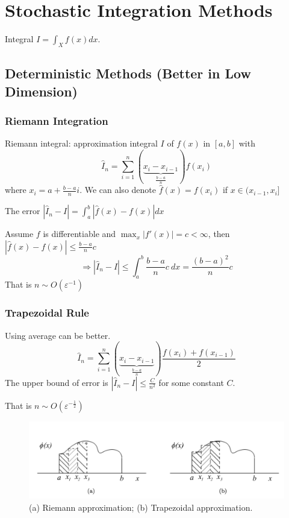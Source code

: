 \documentclass[11pt]{elegantbook}
\begin{document}
\chapter{Stochastic Integration Methods}
Integral $I=\int_Xf(x)dx$.

\section{Deterministic Methods (Better in Low Dimension)}
\subsection{Riemann Integration}
Riemann integral: approximation integral $I$ of $f(x)$ in $[a,b]$ with $$\hat{I}_n=\sum_{i=1}^n(\underbrace{x_i-x_{i-1}}_{\frac{b-a}{n}})f(x_i)$$
where $x_i=a+\frac{b-a}{n}i$. We can also denote $\hat{f}(x)=f(x_i)$ if $x\in (x_{i-1},x_i]$

The error $|\hat{I}_n-I|=\int_a^b|\hat{f}(x)-f(x)|dx$

Assume $f$ is differentiable and $\max_x|f'(x)|=c<\infty$, then $|\hat{f}(x)-f(x)|\leq \frac{b-a}{n}c$
$$\Rightarrow |\hat{I}_n-I|\leq \int_a^b\frac{b-a}{n}c\ dx=\frac{(b-a)^2}{n}c$$
That is $n\sim O\left(\varepsilon^{-1}\right)$

\subsection{Trapezoidal Rule}
Using average can be better. $$\hat{I}_n=\sum_{i=1}^n(\underbrace{x_i-x_{i-1}}_{\frac{b-a}{n}})\frac{f(x_i)+f(x_{i-1})}{2}$$
The upper bound of error is $|\hat{I}_n-I|\leq \frac{C}{n^2}$ for some constant $C$.

That is $n\sim O\left(\varepsilon^{-\frac{1}{2}}\right)$

\begin{center}\begin{figure}[htbp]
    \centering
    \includegraphics[scale=0.2]{Riemann and Trapezoidal.png}
    \caption{(a) Riemann approximation; (b) Trapezoidal approximation.}
    \label{}
\end{figure}\end{center}
\end{document}
